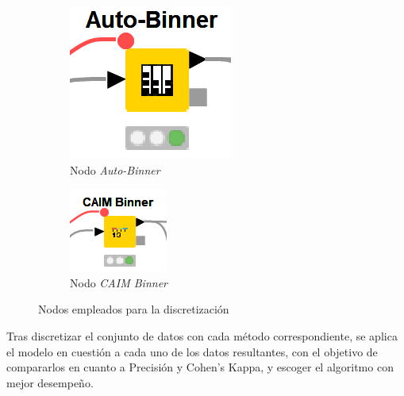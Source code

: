 \begin{figure}[h]
	\centering
	\begin{subfigure}[b]{0.25\linewidth}
		\centering
		\includegraphics[width=0.5\linewidth]{"figuras/capi 2/auto-binner-nodo"}
		\caption{Nodo \textit{Auto-Binner}}
		\label{fig:auto-binner-nodo}
	\end{subfigure}
	\hspace{1.5cm}
	\begin{subfigure}[b]{0.25\linewidth}
		\centering
		\includegraphics[width=0.5\linewidth]{"figuras/capi 2/caim-binner-nodo"}
		\caption{Nodo \textit{CAIM Binner}}
		\label{fig:caim-binner-nodo}
	\end{subfigure}
	\caption{Nodos empleados para la discretización}
	\label{fig:discretizacion-nodos}
\end{figure}

Tras discretizar el conjunto de datos con cada método correspondiente, se aplica el modelo en cuestión a cada uno de los datos resultantes, con el objetivo de compararlos en cuanto a Precisión y Cohen's Kappa, y escoger el algoritmo con mejor desempeño. 

